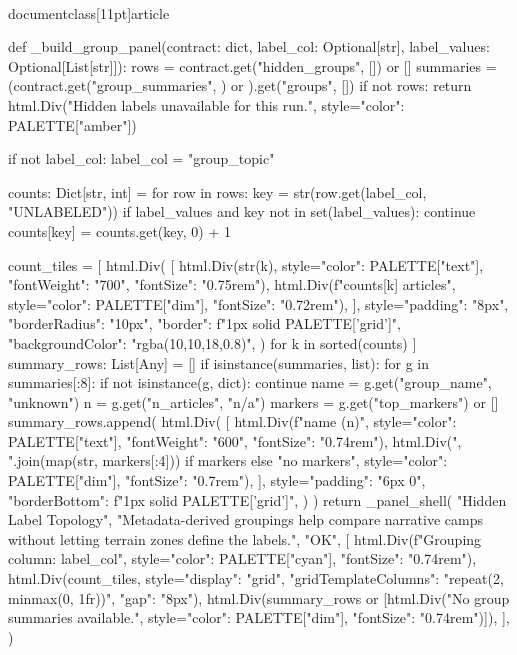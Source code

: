 \\documentclass[11pt]{article}
\begin{document}
\begin{CodeBlock}
{{{{{{{{def _build_group_panel(contract: dict, label_col: Optional[str], label_values: Optional[List[str]]):
    rows = contract.get("hidden_groups", []) or []
    summaries = (contract.get("group_summaries", {}) or {}).get("groups", [])
    if not rows:
        return html.Div("Hidden labels unavailable for this run.", style={"color": PALETTE["amber"]})

    if not label_col:
        label_col = "group_topic"

    counts: Dict[str, int] = {}
    for row in rows:
        key = str(row.get(label_col, "UNLABELED"))
        if label_values and key not in set(label_values):
            continue
        counts[key] = counts.get(key, 0) + 1

    count_tiles = [
        html.Div(
            [
                html.Div(str(k), style={"color": PALETTE["text"], "fontWeight": "700", "fontSize": "0.75rem"}),
                html.Div(f"{counts[k]} articles", style={"color": PALETTE["dim"], "fontSize": "0.72rem"}),
            ],
            style={"padding": "8px", "borderRadius": "10px", "border": f"1px solid {PALETTE['grid']}", "backgroundColor": "rgba(10,10,18,0.8)"},
        )
        for k in sorted(counts)
    ]
    summary_rows: List[Any] = []
    if isinstance(summaries, list):
        for g in summaries[:8]:
            if not isinstance(g, dict):
                continue
            name = g.get("group_name", "unknown")
            n = g.get("n_articles", "n/a")
            markers = g.get("top_markers") or []
            summary_rows.append(
                html.Div(
                    [
                        html.Div(f"{name} ({n})", style={"color": PALETTE["text"], "fontWeight": "600", "fontSize": "0.74rem"}),
                        html.Div(", ".join(map(str, markers[:4])) if markers else "no markers", style={"color": PALETTE["dim"], "fontSize": "0.7rem"}),
                    ],
                    style={"padding": "6px 0", "borderBottom": f"1px solid {PALETTE['grid']}"},
                )
            )
    return _panel_shell(
        "Hidden Label Topology",
        "Metadata-derived groupings help compare narrative camps without letting terrain zones define the labels.",
        "OK",
        [
            html.Div(f"Grouping column: {label_col}", style={"color": PALETTE["cyan"], "fontSize": "0.74rem"}),
            html.Div(count_tiles, style={"display": "grid", "gridTemplateColumns": "repeat(2, minmax(0, 1fr))", "gap": "8px"}),
            html.Div(summary_rows or [html.Div("No group summaries available.", style={"color": PALETTE["dim"], "fontSize": "0.74rem"})]),
        ],
    )


}}}}}}}}
\end{CodeBlock}
\end{document}
